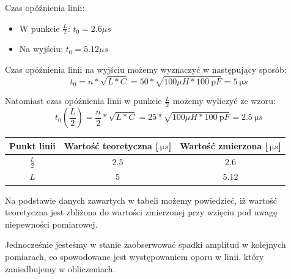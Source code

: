 \documentclass[a4paper,12pt]{article}
\begin{document}
\begin{justify}
Czas opóźnienia linii: \\
\begin{itemize}
\item W punkcie $\frac{L}{2}$: $t_{0} = 2.6 \mu s$
\item Na wyjściu: $t_{0} = 5.12 \mu s$
\end{itemize}

Czas opóźnienia linii na wyjściu możemy wyznaczyć w następujący sposób:
\begin{equation}
t_{0} = n * \sqrt{L * C} = 50 * \sqrt{100 \mu H * \SI{100}{\pico F}} = \SI{5}{\micro s} 
\end{equation}

Natomiast czas opóźnienia linii w punkcie $\frac{L}{2}$ możemy wyliczyć ze wzoru:
\begin{equation}
t_{0}(\frac{L}{2}) = \frac{n}{2} * \sqrt{L * C} = 25 * \sqrt{100 \mu H * \SI{100}{\pico F}} = \SI{2.5}{\micro s} 
\end{equation}

\begin{center}
\begin{tabular}{ @{}|c|c|c|@{} }
\hline
Punkt linii & Wartość teoretyczna [$\SI{}{\micro s}$] & Wartość zmierzona [$\SI{}{\micro s}$] \\
\hline
$\frac{L}{2}$ & 2.5 & 2.6 \\
\hline
$L$ & 5 & 5.12 \\
\hline
\end{tabular}
\end{center}

Na podstawie danych zawartych w tabeli możemy powiedzieć, iż wartość teoretyczna jest zbliżona do wartości zmierzonej przy wzięciu pod uwagę niepewności pomiarowej.

Jednocześnie jesteśmy w stanie zaobserwować spadki amplitud w kolejnych pomiarach, co spowodowane jest występowaniem oporu w linii, który zaniedbujemy w obliczeniach. 

\newpage


\end{justify}
\end{document}

